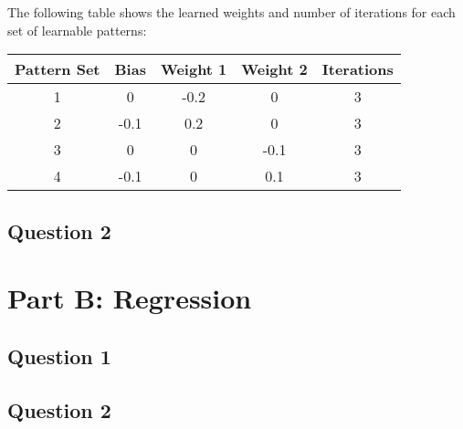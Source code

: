 \documentclass{article}
\begin{document}
The following table shows the learned weights and number of iterations for each set of learnable patterns:
\begin{center}
    \begin{tabular}{ c | c | c | c | c }
        Pattern Set & Bias & Weight 1 & Weight 2 & Iterations \\
        \hline
        1           & 0    & -0.2     & 0        & 3          \\
        \hline
        2           & -0.1 & 0.2      & 0        & 3          \\
        \hline
        3           & 0    & 0        & -0.1     & 3          \\
        \hline
        4           & -0.1 & 0        & 0.1      & 3          \\
    \end{tabular}
\end{center}

\subsection*{Question 2}

\section*{Part B: Regression}
\subsection*{Question 1}

\subsection*{Question 2}
\end{document}
